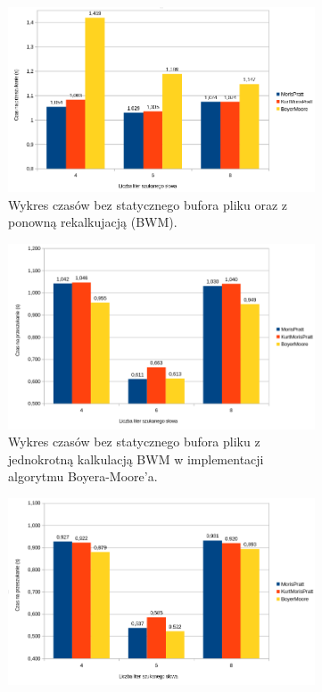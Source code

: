 \begin{figure}
\centering
\begin{subfigure}{0.7\textwidth}
    \includegraphics[width=\textwidth]{./images/GraphFirstAttempt.png}
    \caption{Wykres czasów bez statycznego bufora pliku oraz z ponowną 
    rekalkujacją (BWM).}
    \label{fig:GraphFirstAttempt}
\end{subfigure}
\begin{subfigure}{0.7\textwidth}
    \includegraphics[width=\textwidth]{./images/GraphPreAllocBM.png}
    \caption{Wykres czasów bez statycznego bufora pliku z jednokrotną kalkulacją
     BWM w implementacji algorytmu Boyera-Moore'a. }
    \label{fig:GraphPreAllocBM}
\end{subfigure}
\begin{subfigure}{0.7\textwidth}
    \includegraphics[width=\textwidth]{./images/GraphStaticPreallocAndFileBuffer.png}

\end{subfigure}
\end{figure}
